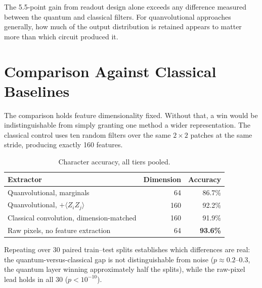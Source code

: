 \documentclass[11pt,a4paper]{article}
\begin{document}
The 5.5-point gain from readout design alone exceeds any difference measured
between the quantum and classical filters. For quanvolutional approaches
generally, how much of the output distribution is retained appears to matter more
than which circuit produced it.

\section{Comparison Against Classical Baselines}

The comparison holds feature dimensionality fixed. Without that, a win would be
indistinguishable from simply granting one method a wider representation. The
classical control uses ten random filters over the same $2\times2$ patches at the
same stride, producing exactly 160 features.

\begin{table}[h]
\centering
\caption{Character accuracy, all tiers pooled.}
\begin{tabular}{@{}lrr@{}}
\toprule
Extractor & Dimension & Accuracy \\
\midrule
Quanvolutional, marginals & 64 & 86.7\% \\
Quanvolutional, $+\langle Z_iZ_j\rangle$ & 160 & 92.2\% \\
Classical convolution, dimension-matched & 160 & 91.9\% \\
Raw pixels, no feature extraction & 64 & \textbf{93.6\%} \\
\bottomrule
\end{tabular}
\end{table}

Repeating over 30 paired train--test splits establishes which differences are
real: the quantum-versus-classical gap is not distinguishable from noise
($p \approx 0.2$--$0.3$, the quantum layer winning approximately half the
splits), while the raw-pixel lead holds in all 30 ($p < 10^{-10}$).

\end{document}

